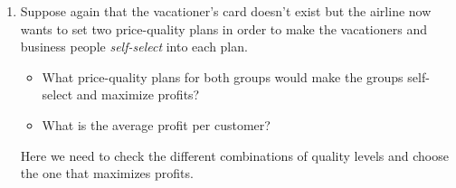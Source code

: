 \documentclass[12pt]{article}
\newcounter{question}[section]
\newenvironment{subquestions}{
  \begin{enumerate}[label=(\roman*)]}{\end{enumerate}}
\begin{document}
\begin{subquestions}
      \textcolor{solution-color}{
        \begin{itemize}
          \item If the airline wanted to sell to both groups it should offer $q=20$ for 200. Vacationers would buy it and get zero surplus. The business people would buy it and get surplus equal to 200. The average profit per person is 200 (since everyone buys it).
        \item If the airline focused only on the business people, the airline should offer $q=30$ like in (i) for 450. The average profit per person is then $0.5\times 450=225$ (since you lose the vacationers).
        \item Therefore if the airline was only going to set a single price-quality pair, it should sell only to business people.
      \end{itemize}
      }
  \item Suppose again that the vacationer's card doesn't exist but the airline now wants to set two price-quality plans in order to make the vacationers and business people \emph{self-select} into each plan.
    \begin{itemize}
      \item What price-quality plans for both groups would make the groups self-select and maximize profits?
      \item What is the average profit per customer?
    \end{itemize}

      \textcolor{solution-color}{
        Here we need to check the different combinations of quality levels and choose the one that maximizes profits.
      }


\end{subquestions}
\end{document}
